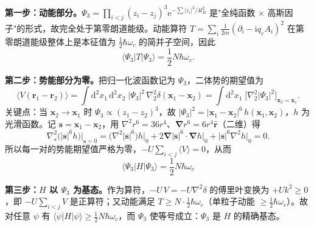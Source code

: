 \textbf{第一步：动能部分。}$\Psi_3=\prod_{i<j}(z_i-z_j)^3\mathrm{e}^{-\sum|z_i|^2/4l_B^2}$ 是"全纯函数 $\times$ 高斯因子"的形式，故完全处于第零朗道能级。动能算符 $T=\sum_i\frac{1}{2m}(\partial_i-\mathrm{i}q_eA_i)^2$ 在第零朗道能级整体上是本征值为 $\tfrac12\hbar\omega_c$ 的简并子空间，因此
\begin{equation*}
\langle\Psi_3|T|\Psi_3\rangle=\frac12N\hbar\omega_c .
\end{equation*}

\textbf{第二步：势能部分为零。}把归一化波函数记为 $\Psi_3$，二体势的期望值为
\begin{equation*}
\big\langle V(\pmb{r}_1-\pmb{r}_2)\big\rangle
=\int\mathrm{d}^2x_1\,\mathrm{d}^2x_2\;|\Psi_3|^2\,
\nabla_{\!2}^2\delta(\pmb{x}_1-\pmb{x}_2)
=\int\mathrm{d}^2x_1\;\Big[\nabla_{\!2}^2|\Psi_3|^2\Big]_{\pmb{x}_2=\pmb{x}_1}.
\end{equation*}
关键点：当 $\pmb{x}_2\to\pmb{x}_1$ 时 $\Psi_3\propto(z_1-z_2)^3$，故 $|\Psi_3|^2=|\pmb{x}_1-\pmb{x}_2|^6\,h(\pmb{x}_1,\pmb{x}_2)$，$h$ 为光滑函数。记 $\pmb{s}=\pmb{x}_1-\pmb{x}_2$，用 $\nabla^2r^{6}=36r^4$、$\pmb{\nabla}r^6=6r^4\hat{\pmb r}$（二维）得
\begin{equation*}
\nabla_{\!s}^2\big(|\pmb{s}|^6h\big)\Big|_{\pmb{s}=0}
=\big(\nabla^2|\pmb{s}|^6\big)h\big|_{0}
+2\pmb{\nabla}|\pmb{s}|^6\cdot\pmb{\nabla}h\big|_{0}
+|\pmb{s}|^6\nabla^2h\big|_{0}=0 .
\end{equation*}
所以每一对的势能期望值严格为零，$-U\sum_{i<j}\langle V\rangle=0$，从而
\begin{equation*}
\boxed{\;\langle\Psi_3|H|\Psi_3\rangle=\frac12N\hbar\omega_c\;}
\end{equation*}

\textbf{第三步：$H$ 以 $\Psi_3$ 为基态。}作为算符，$-U\,V=-U\nabla^2\delta$ 的傅里叶变换为 $+Uk^2\geqslant0$，即 $-U\sum_{i<j}V$ 是正算符；又动能满足 $T\geqslant N\cdot\tfrac12\hbar\omega_c$（单粒子动能 $\geqslant\tfrac12\hbar\omega_c$）。故对任意 $\psi$ 有 $\langle\psi|H|\psi\rangle\geqslant\tfrac12N\hbar\omega_c$，而 $\Psi_3$ 使等号成立：$\Psi_3$ 是 $H$ 的精确基态。

